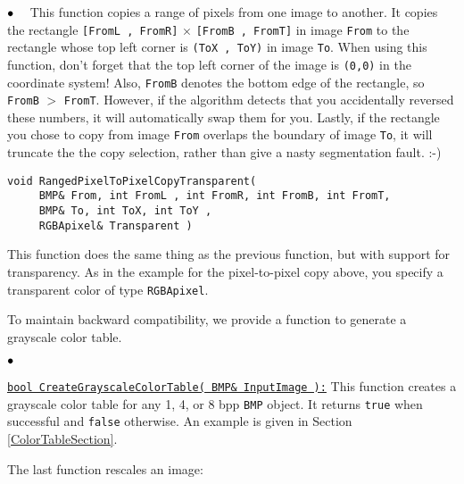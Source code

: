 \documentclass[12pt]{article}
\begin{document}
\begin{list}{$\bullet\hspace{.125in}$}{}
This function copies a range of pixels from one image to another. It copies 
the rectangle \break \texttt{[FromL , FromR]} $\times$ \texttt{[FromB , FromT]}
in image \texttt{From} to the rectangle whose top left corner is 
\texttt{(ToX , ToY)} in image \texttt{To}. When using this function, don't forget 
that the top left corner of the image is \texttt{(0,0)} in the coordinate system! 
Also, \texttt{FromB} denotes the bottom edge of the rectangle, so 
\texttt{FromB} $>$ \texttt{FromT}.  However, if the algorithm detects that you 
accidentally reversed these numbers, it will automatically swap them for you.  Lastly, 
if the rectangle you chose to copy from image \texttt{From} overlaps the boundary 
of image \texttt{To}, it will truncate the the copy selection, rather than give a 
nasty segmentation fault. :-) 

\item 
\begin{verbatim}
void RangedPixelToPixelCopyTransparent( 
     BMP& From, int FromL , int FromR, int FromB, int FromT, 
     BMP& To, int ToX, int ToY ,
     RGBApixel& Transparent )
\end{verbatim}

This function does the same thing as the previous function, but with 
support for transparency.  As in the example for the pixel-to-pixel 
copy above, you specify a transparent color of type \texttt{RGBApixel}. 

\end{list}

To maintain backward compatibility, we provide a function 
to generate a grayscale color table.

\begin{list}{$\bullet\hspace{.125in}$}{}
\item
\underline{\texttt{bool CreateGrayscaleColorTable( BMP\& InputImage ):}}
This function creates a grayscale color table for any 1, 4, or 8 bpp 
\texttt{BMP} object. It returns \texttt{true} when successful 
and \texttt{false} otherwise. An example is given in Section 
\ref{ColorTableSection}.
\end{list}

The last function rescales an image:
\end{document}
